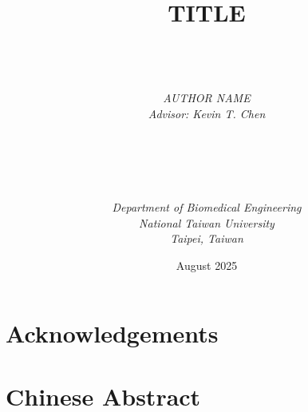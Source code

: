 \documentclass[a4paper, 12pt, twoside, openright]{mythesis}
\begin{document}
\title{\textbf{TITLE}}


\author{ \\  \\ \\
{\it AUTHOR NAME}\\
{\it Advisor: Kevin T. Chen} \\ \\ \\ \\  \\ \\
{\it Department of Biomedical Engineering}\\
{\it National Taiwan University} \\
{\it Taipei, Taiwan}\\ }

{\date{August 2025}}

\maketitle


% 
\frontmatter
\cleardoublepage

\setcounter{page}{1}
\chapter*{Acknowledgements}
\cleardoublepage

\setcounter{page}{3}
\chapter*{Chinese Abstract}


\tableofcontents
\listoffigures
\listoftables



\mainmatter













\appendix
\cleardoublepage

\end{document}
